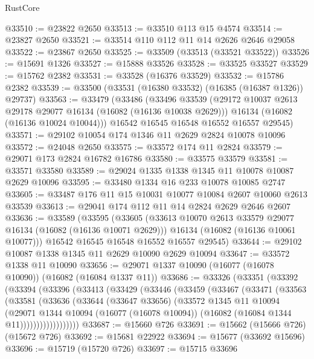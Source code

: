 \begin{lexlean}{RustCore}
\begin{coremodule}
@33510 := @23822 @2650
@33513 := @33510 @113 @15 @4574
@33514 := @23827 @2650
@33521 := @33514 @110 @112 @11 @14 @2626 @2646 @29058
@33522 := @23867 @2650
@33525 := @33509 (@33513 (@33521 @33522))
@33526 := @15691 @1326
@33527 := @15888 @33526
@33528 := @33525 @33527
@33529 := @15762 @2382
@33531 := @33528 (@16376 @33529)
@33532 := @15786 @2382
@33539 := @33500 (@33531 (@16380 @33532) (@16385 (@16387 @1326)) @29737)
@33563 := @33479
    (@33486
      (@33496
        @33539
        (@29172 @10037 @2613 @29178 @29077 @16134 (@16082 (@16136 @10038 @2629)))
        @16134
        (@16082 (@16136 @10024 @10044)))
      @16542
      @16545
      @16548
      @16552
      @16557
      @29545)
@33571 := @29102 @10054 @174 @1346 @11 @2629 @2824 @10078 @10096
@33572 := @24048 @2650
@33575 := @33572 @174 @11 @2824
@33579 := @29071 @173 @2824 @16782 @16786
@33580 := @33575 @33579
@33581 := @33571 @33580
@33589 := @29024 @1335 @1338 @1345 @11 @10078 @10087 @2629 @10096
@33595 := @33480 @1334 @16 @233 @10078 @10085 @2747
@33605 := @33487 @176 @11 @15 @10031 @10077 @10084 @2607 @10060 @2613 @33539
@33613 := @29041 @174 @112 @11 @14 @2824 @2629 @2646 @2607
@33636 := @33589
    (@33595
      (@33605
        (@33613 @10070 @2613 @33579 @29077 @16134 (@16082 (@16136 @10071 @2629)))
        @16134
        (@16082 (@16136 @10061 @10077)))
      @16542
      @16545
      @16548
      @16552
      @16557
      @29545)
@33644 := @29102 @10087 @1338 @1345 @11 @2629 @10090 @2629 @10094
@33647 := @33572 @1338 @11 @10090
@33656 := @29071 @1337 @10090 (@16077 (@16078 @10090)) (@16082 (@16084 @1337 @11))
@33686 := @33326
    (@33351
      (@33392
        (@33394
          (@33396
            (@33413
              (@33429
                (@33446
                  (@33459
                    (@33467
                      (@33471
                        (@33563
                          (@33581
                            (@33636
                              (@33644
                                (@33647 @33656)
                                (@33572
                                  @1345
                                  @11
                                  @10094
                                  (@29071
                                    @1344
                                    @10094
                                    (@16077 (@16078 @10094))
                                    (@16082 (@16084 @1344 @11))))))))))))))))))
@33687 := @15660 @726
@33691 := @15662 (@15666 @726) (@15672 @726)
@33692 := @15681 @22922
@33694 := @15677 (@33692 @15696)
@33696 := @15719 (@15720 @726)
@33697 := @15715 @33696

\end{coremodule}
\end{lexlean}
